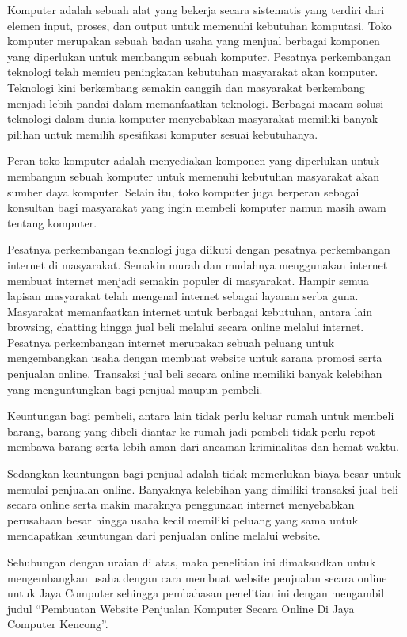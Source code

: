 \documentclass[11pt]{article}
\begin{document}
Komputer adalah sebuah alat yang bekerja secara sistematis yang terdiri dari
elemen input, proses, dan output untuk memenuhi kebutuhan komputasi. Toko
komputer merupakan sebuah badan usaha yang menjual berbagai komponen yang
diperlukan untuk membangun sebuah komputer. Pesatnya perkembangan teknologi telah
memicu peningkatan kebutuhan masyarakat akan komputer. Teknologi kini berkembang
semakin canggih dan masyarakat berkembang menjadi lebih pandai dalam memanfaatkan
teknologi. Berbagai macam solusi teknologi dalam dunia komputer menyebabkan
masyarakat memiliki banyak pilihan untuk memilih spesifikasi komputer sesuai
kebutuhanya.

Peran toko komputer adalah menyediakan komponen yang diperlukan untuk membangun
sebuah komputer untuk memenuhi kebutuhan masyarakat akan sumber daya komputer.
Selain itu, toko komputer juga berperan sebagai konsultan bagi masyarakat yang
ingin membeli komputer namun masih awam tentang komputer.

Pesatnya perkembangan teknologi juga diikuti dengan pesatnya perkembangan
internet di masyarakat. Semakin murah dan mudahnya menggunakan internet membuat
internet menjadi semakin populer di masyarakat. Hampir semua lapisan masyarakat
telah mengenal internet sebagai layanan serba guna. Masyarakat memanfaatkan
internet untuk berbagai kebutuhan, antara lain browsing, chatting hingga jual
beli melalui secara online melalui internet. Pesatnya perkembangan internet
merupakan sebuah peluang untuk mengembangkan usaha dengan membuat website untuk
sarana promosi serta penjualan online. Transaksi jual beli secara online memiliki
banyak kelebihan yang menguntungkan bagi penjual maupun pembeli.

Keuntungan bagi pembeli, antara lain tidak perlu keluar rumah untuk membeli
barang, barang yang dibeli diantar ke rumah jadi pembeli tidak perlu
repot membawa barang serta lebih aman dari ancaman kriminalitas dan hemat waktu.

Sedangkan keuntungan bagi penjual adalah tidak memerlukan biaya besar untuk
memulai penjualan online. Banyaknya kelebihan yang dimiliki transaksi jual beli
secara online serta makin maraknya penggunaan internet menyebabkan perusahaan
besar hingga usaha kecil memiliki peluang yang sama untuk mendapatkan keuntungan
dari penjualan online melalui website.

Sehubungan dengan uraian di atas, maka penelitian ini dimaksudkan untuk
mengembangkan usaha dengan cara membuat website penjualan secara online untuk
Jaya Computer sehingga pembahasan penelitian ini dengan mengambil judul
``Pembuatan Website Penjualan Komputer Secara Online Di Jaya Computer Kencong''.
\end{document}

